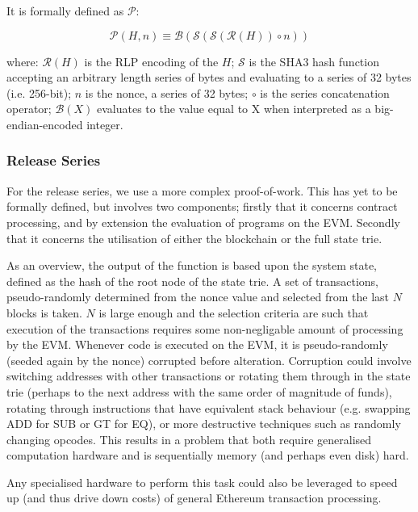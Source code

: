 \documentclass[9pt,oneside]{amsart}
\begin{document}
\begin{multicols}{2}
It is formally defined as $\mathcal{P}$:

\begin{equation}
\mathcal{P}(H, n) \equiv \mathcal{B}(\mathcal{S}(\mathcal{S}(\mathcal{R}(H)) \circ n))
\end{equation}

where:
$\mathcal{R}(H)$ is the RLP encoding of the $H$;
$\mathcal{S}$ is the SHA3 hash function accepting an arbitrary length series of bytes and evaluating to a series of 32 bytes (i.e. 256-bit);
$n$ is the nonce, a series of 32 bytes;
$\circ$ is the series concatenation operator;
$\mathcal{B}(X)$ evaluates to the value equal to X when interpreted as a big-endian-encoded integer.

\subsubsection{Release Series}

For the release series, we use a more complex proof-of-work. This has yet to be formally defined, but involves two components; firstly that it concerns contract processing, and by extension the evaluation of programs on the EVM. Secondly that it concerns the utilisation of either the blockchain or the full state trie.

As an overview, the output of the function is based upon the system state, defined as the hash of the root node of the state trie. A set of transactions, pseudo-randomly determined from the nonce value and selected from the last $N$ blocks is taken. $N$ is large enough and the selection criteria are such that execution of the transactions requires some non-negligable amount of processing by the EVM. Whenever code is executed on the EVM, it is pseudo-randomly (seeded again by the nonce) corrupted before alteration. Corruption could involve switching addresses with other transactions or rotating them through in the state trie (perhaps to the next address with the same order of magnitude of funds), rotating through instructions that have equivalent stack behaviour (e.g. swapping {\small ADD} for {\small SUB} or {\small GT} for {\small EQ}), or more destructive techniques such as randomly changing opcodes. This results in a problem that both require generalised computation hardware and is sequentially memory (and perhaps even disk) hard.

Any specialised hardware to perform this task could also be leveraged to speed up (and thus drive down costs) of general Ethereum transaction processing.


\end{multicols}
\end{document}
